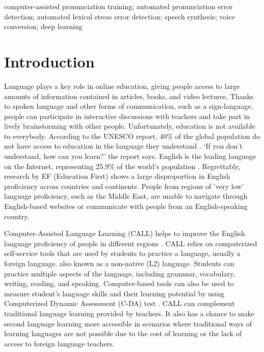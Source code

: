 \documentclass[]{interact}
\theoremstyle{plain}%
\theoremstyle{definition}
\theoremstyle{remark}
\begin{document}
\begin{keywords}
computer-assisted pronunciation training; automated pronunciation error detection; automated lexical stress error detection; speech synthesis; voice conversion; deep learning
\end{keywords}

\section{Introduction}

Language plays a key role in online education, giving people access to large amounts of information contained in articles, books, and video lectures. Thanks to spoken language and other forms of communication, such as a sign-language, people can participate in interactive discussions with teachers and take part in lively brainstorming with other people. Unfortunately, education is not available to everybody. According to the UNESCO report, 40\% of the global population do not have access to education in the language they understand \cite{unesco2016if}.  ‘If you don’t understand, how can you learn?' the report says. English is the leading language on the Internet, representing 25.9\% of the world's population \cite{statista2020}. Regrettably, research by EF (Education First) \cite{EPI2020} shows a large disproportion in English proficiency across countries and continents. People from regions of 'very low' language proficiency, such as the Middle East, are unable to navigate through English-based websites or communicate with people from an English-speaking country.

Computer-Assisted Language Learning (CALL) helps to improve the English language proficiency of people in different regions \cite{levy2013call}. CALL relies on computerized self-service  tools that are used by students to practice a language, usually a foreign language, also known as a non-native (L2) language. Students can practice multiple aspects of the language, including grammar, vocabulary, writing, reading, and speaking. Computer-based tools can also be used to measure student's language skills and their learning potential by using Computerized Dynamic Assessment (C-DA) test \cite{mehri2019diagnosing}. CALL can complement traditional language learning provided by teachers. It also has a chance to make second language learning more accessible in scenarios where traditional ways of learning languages are not possible due to the cost of learning or the lack of access to foreign language teachers.
\end{document}
